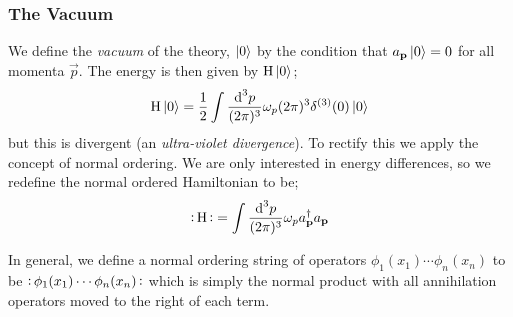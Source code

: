 \subsubsection{The Vacuum}
We define the \emph{vacuum} of the theory, $\ket{0}$ by the condition that $a_{\mathbf p} \ket{0} = 0$ for all momenta $\vec p$. The energy is then given by $\text{H}\ket{0}$;
\begin{equation}
\text{H}\ket{0} = \frac{1}{2}\int{\frac{\text{d}^3 p}{(2\pi)^3} \omega_p (2\pi)^3 \delta^{(3)}(0) \ket{0}}
\end{equation}
but this is divergent (an \emph{ultra-violet divergence}). To rectify this we apply the concept of normal ordering. We are only interested in energy differences, so we redefine the normal ordered Hamiltonian to be;\footnotemark
{}
\begin{equation}
\normord{\text{H}} = \int{\frac{\ud^3 p}{(2\pi)^3}\omega_p a_{\vec p}\dagg a_{\vec p}}
\end{equation}
\begin{definitionbox}
In general, we define a normal ordering string of operators $\phi_1(x_1)\cdots\phi_n(x_n)$ to be $\normord{\phi_1(x_1)\cdots\phi_n(x_n)}$ which is simply the normal product with all annihilation operators moved to the right of each term.
\end{definitionbox}
